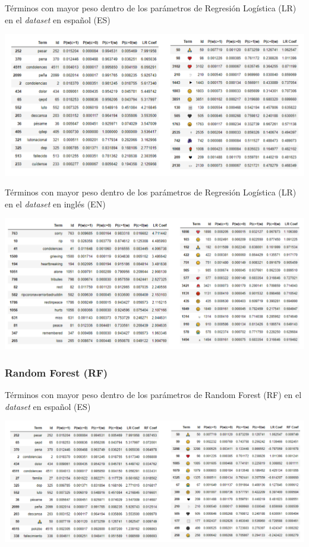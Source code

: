 \begin{table}[H]
    \centering
    \caption{Términos con mayor peso dentro de los parámetros de Regresión Logística (LR) en el \textit{dataset} en español (ES)}
    \label{tab:lr_coef_es}
    \includegraphics[width=\textwidth]{doc/images/LR_Coef_es.png}
\end{table}

\begin{table}[H]
    \centering
    \caption{Términos con mayor peso dentro de los parámetros de Regresión Logística (LR) en el \textit{dataset} en inglés (EN)}
    \label{tab:lr_coef_en}
    \includegraphics[width=\textwidth]{doc/images/LR_Coef_en.png}
\end{table}

\subsubsection{Random Forest (RF)}

\begin{table}[H]
    \centering
    \caption{Términos con mayor peso dentro de los parámetros de Random Forest (RF) en el \textit{dataset} en español (ES)}
    \label{tab:lr_coef_es}
    \includegraphics[width=\textwidth]{doc/images/RF_Coef_es.png}
\end{table}

